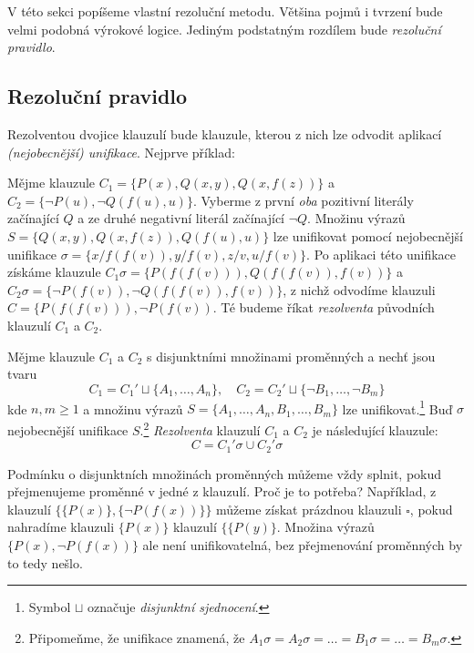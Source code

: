 V této sekci popíšeme vlastní rezoluční metodu. Většina pojmů i tvrzení bude velmi podobná výrokové logice. Jediným podstatným rozdílem bude \emph{rezoluční pravidlo}.


\subsection{Rezoluční pravidlo}

Rezolventou dvojice klauzulí bude klauzule, kterou z nich lze odvodit aplikací \emph{(nejobecnější) unifikace}. Nejprve příklad:

\begin{example}
Mějme klauzule $C_1=\{P(x),Q(x,y),Q(x,f(z))\}$ a $C_2=\{\neg P(u),\neg Q(f(u),u)\}$. Vyberme z první \emph{oba} pozitivní literály začínající $Q$ a ze druhé negativní literál začínající $\neg Q$. Množinu výrazů $S=\{Q(x,y),Q(x,f(z)),Q(f(u),u)\}$ lze unifikovat pomocí nejobecnější unifikace $\sigma=\{x/f(f(v)),y/f(v),z/v,u/f(v)\}$. Po aplikaci této unifikace získáme klauzule $C_1\sigma=\{P(f(f(v))),Q(f(f(v)),f(v))\}$ a $C_2\sigma=\{\neg P(f(v)),\neg Q(f(f(v)),f(v))\}$, z nichž odvodíme klauzuli $C=\{P(f(f(v))),\neg P(f(v))$. Té budeme říkat \emph{rezolventa} původních klauzulí $C_1$ a $C_2$.
\end{example}

\begin{definition}
    Mějme klauzule $C_1$ a $C_2$ s disjunktními množinami proměnných a nechť jsou tvaru
    $$
    C_1=C_1'\sqcup \{A_1,\dots,A_n\},\quad C_2=C_2'\sqcup \{\neg B_1,\dots,\neg B_m\}
    $$
    kde $n,m\ge 1$ a množinu výrazů $S=\{A_1,\dots,A_n,B_1,\dots,B_m\}$ lze unifikovat.\footnote{Symbol $\sqcup$ označuje \emph{disjunktní sjednocení}.} Buď $\sigma$ nejobecnější unifikace $S$.\footnote{Připomeňme, že unifikace znamená, že $A_1\sigma=A_2\sigma=\dots=B_1\sigma=\dots=B_m\sigma$.} \emph{Rezolventa} klauzulí $C_1$ a $C_2$ je následující klauzule:
    $$
    C=C_1'\sigma \cup C_2'\sigma
    $$
\end{definition}

\begin{remark}\label{remark:resolution-step-rename}
    Podmínku o disjunktních množinách proměnných můžeme vždy splnit, pokud přejmenujeme proměnné v jedné z klauzulí. Proč je to potřeba? Například, z klauzulí $\{\{P(x)\},\{\neg P(f(x))\}\}$ můžeme získat prázdnou klauzuli $\square$, pokud nahradíme klauzuli $\{P(x)\}$ klauzulí $\{\{P(y)\}$. Množina výrazů $\{P(x),\neg P(f(x))\}$ ale není unifikovatelná, bez přejmenování proměnných by to tedy nešlo.
\end{remark}


